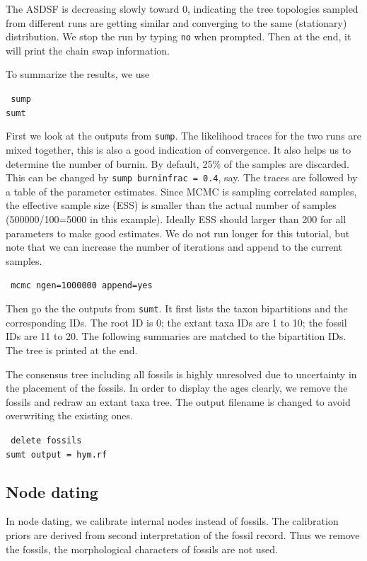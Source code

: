 \documentclass[12pt]{article}
\begin{document}
\noindent The ASDSF is decreasing slowly toward 0, indicating the tree topologies sampled from different runs are getting similar and converging to the same (stationary) distribution.
We stop the run by typing {\tt no} when prompted.
Then at the end, it will print the chain swap information.

To summarize the results, we use

\medskip
{\tt \color{red} \noindent
sump  \\
sumt
}
\medskip

First we look at the outputs from {\tt sump}.
The likelihood traces for the two runs are mixed together, this is also a good indication of convergence. It also helps us to determine the number of burnin.
By default, 25\% of the samples are discarded. This can be changed by {\tt sump burninfrac = 0.4}, say. 
The traces are followed by a table of the parameter estimates.
Since MCMC is sampling correlated samples, the effective sample size (ESS) is smaller than the actual number of samples (500000/100=5000 in this example).
Ideally ESS should larger than 200 for all parameters to make good estimates.
We do not run longer for this tutorial, but note that we can increase the number of iterations and append to the current samples.

\medskip
{\tt \color{red} \noindent
mcmc ngen=1000000 append=yes
}
\medskip

Then go the the outputs from {\tt sumt}.
It first lists the taxon bipartitions and the corresponding IDs.
The root ID is 0; the extant taxa IDs are 1 to 10; the fossil IDs are 11 to 20.
The following summaries are matched to the bipartition IDs.
The tree is printed at the end.

The consensus tree including all fossils is highly unresolved due to uncertainty in the placement of the fossils.
In order to display the ages clearly, we remove the fossils and redraw an extant taxa tree. The output filename is changed to avoid overwriting the existing ones.

\medskip
{\tt \color{red} \noindent
delete fossils  \\
sumt output = hym.rf
}
\medskip

\subsection{Node dating}

In node dating, we calibrate internal nodes instead of fossils.
The calibration priors are derived from second interpretation of the fossil record.
Thus we remove the fossils, the morphological characters of fossils are not used.
\end{document}
